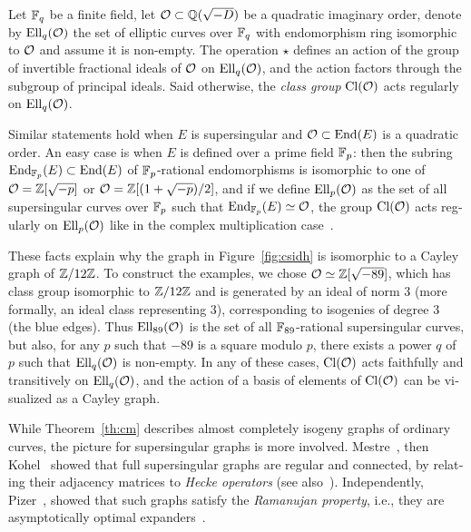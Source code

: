 \begin{otherlanguage}{english}
  \begin{theorem}
    \label{th:cm}
    Let $\mathbb{F}_q$ be a finite field, let $\mathcal{O}\subset\mathbb{Q}(\sqrt{-D})$ be a
    quadratic imaginary order, denote by $\mathrm{Ell}_q(\mathcal{O})$ the set of
    elliptic curves over $\mathbb{F}_q$ with endomorphism ring isomorphic to
    $\mathcal{O}$ and assume it is non-empty. The operation $\star$ defines an
    action of the group of invertible fractional ideals of $\mathcal{O}$ on
    $\mathrm{Ell}_q(\mathcal{O})$, and the action factors through the subgroup of
    principal ideals. Said otherwise, the \emph{class group} $\mathrm{Cl}(\mathcal{O})$
    acts regularly on $\mathrm{Ell}_q(\mathcal{O})$.
  \end{theorem}

  Similar statements hold when $E$ is supersingular and
  $\mathcal{O}\subset\mathrm{End}(E)$ is a quadratic order. An easy case is when $E$ is
  defined over a prime field $\mathbb{F}_p$: then the subring
  $\mathrm{End}_{\mathbb{F}_p}(E)\subset\mathrm{End}(E)$ of $\mathbb{F}_p$-rational endomorphisms is
  isomorphic to one of $\mathcal{O}=\mathbb{Z}[\sqrt{-p}]$ or $\mathcal{O}=\mathbb{Z}[(1+\sqrt{-p})/2]$,
  and if we define $\mathrm{Ell}_p(\mathcal{O})$ as the set of all supersingular curves
  over $\mathbb{F}_p$ such that $\mathrm{End}_{\mathbb{F}_p}(E)\simeq\mathcal{O}$, the group $\mathrm{Cl}(\mathcal{O})$
  acts regularly on $\mathrm{Ell}_p(\mathcal{O})$ like in the complex multiplication
  case~\cite{Delfs2016}.

  These facts explain why the graph in Figure~\ref{fig:csidh} is
  isomorphic to a Cayley graph of $\mathbb{Z}/12\mathbb{Z}$. To construct the
  examples, we chose $\mathcal{O}\simeq\mathbb{Z}[\sqrt{-89}]$, which has class group
  isomorphic to $\mathbb{Z}/12\mathbb{Z}$ and is generated by an ideal of norm $3$
  (more formally, an ideal class representing $3$), corresponding to
  isogenies of degree $3$ (the blue edges). Thus $\mathrm{Ell}_{89}(\mathcal{O})$ is
  the set of all $\mathbb{F}_{89}$-rational supersingular curves, but also,
  for any $p$ such that $-89$ is a square modulo $p$, there exists a
  power $q$ of $p$ such that $\mathrm{Ell}_q(\mathcal{O})$ is non-empty. In any of
  these cases, $\mathrm{Cl}(\mathcal{O})$ acts faithfully and transitively on
  $\mathrm{Ell}_q(\mathcal{O})$, and the action of a basis of elements of $\mathrm{Cl}(\mathcal{O})$ can
  be visualized as a Cayley graph.

  While Theorem~\ref{th:cm} describes almost completely isogeny graphs
  of ordinary curves, the picture for supersingular graphs is more
  involved. Mestre~\cite{mestre86}, then Kohel~\cite{kohel} showed
  that full supersingular graphs are regular and connected, by
  relating their adjacency matrices to \emph{Hecke operators} (see
  also~\cite{emerton2002supersingular}).  Independently,
  Pizer~\cite{pizer1,pizer2}, showed that such graphs satisfy the
  \emph{Ramanujan property}, i.e., they are asymptotically optimal
  expanders~\cite{hoory2006expander}.


\end{otherlanguage}
